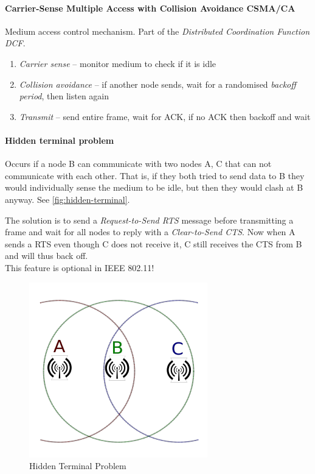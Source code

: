 \paragraph{Carrier-Sense Multiple Access with Collision Avoidance CSMA/CA}
Medium access control mechanism.
Part of the \textit{Distributed Coordination Function DCF}.
\begin{enumerate}
	\item \textit{Carrier sense} -- monitor medium to check if it is idle
	\item \textit{Collision avoidance} -- if another node sends, wait for a randomised \textit{backoff period}, then listen again
	\item \textit{Transmit} -- send entire frame, wait for ACK, if no ACK then backoff and wait
\end{enumerate}

\paragraph{Hidden terminal problem}
Occurs if a node B can communicate with two nodes A, C that can not communicate with each other.
That is, if they both tried to send data to B they would individually sense the medium to be idle, but then they would clash at B anyway.
See \autoref{fig:hidden-terminal}.

The solution is to send a \textit{Request-to-Send RTS} message before transmitting a frame and wait for all nodes to reply with a \textit{Clear-to-Send CTS}.
Now when A sends a RTS even though C does not receive it, C still receives the CTS from B and will thus back off.
\\
This feature is optional in IEEE 802.11!

\begin{figure}
	\centering
	\includegraphics[scale=0.6]{images/9-hidden-terminal.png}
	\caption{Hidden Terminal Problem}
	\label{fig:hidden-terminal}
\end{figure}

